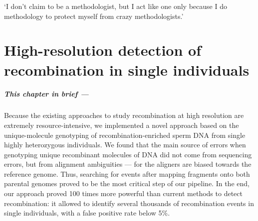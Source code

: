 \begin{savequote}[8cm]
	‘I don't claim to be a methodologist, but I act like one only because I do methodology to protect myself from crazy methodologists.’
	
	
\end{savequote}

\chapter{\label{ch:5-methodology}High-resolution detection of recombination in single individuals}

\minitoc{}

{\small{} \itshape{}

\paragraph{This chapter in brief —}

Because the existing approaches to study recombination at high resolution are extremely resource-intensive, we implemented a novel approach based on the unique-molecule genotyping of recombination-enriched sperm DNA from single highly heterozygous individuals.
We found that the main source of errors when genotyping unique recombinant molecules of DNA did not come from sequencing errors, but from alignment ambiguities — for the aligners are biased towards the reference genome.
Thus, searching for events after mapping fragments onto both parental genomes proved to be the most critical step of our pipeline.
In the end, our approach proved 100 times more powerful than current methods to detect recombination: it allowed to identify several thousands of recombination events in single individuals, with a false positive rate below 5\%.

}

